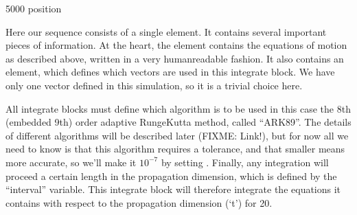 \documentclass[letterpaper,10pt,english]{sphinxmanual}
\begin{document}
\begin{sphinxVerbatim}[commandchars=\\\{\}]
     
    5000
      position
      \PYG{c+cp}{\PYGZlt{}![CDATA[}
        
            
          
      \PYG{c+cp}{]]\PYGZgt{}}
\end{sphinxVerbatim}

\sphinxAtStartPar
Here our sequence consists of a single  element.  It contains several important pieces of information.  At the heart, the  element contains the equations of motion as described above, written in a very human\sphinxhyphen{}readable fashion.  It also contains an  element, which defines which vectors are used in this integrate block.  We have only one vector defined in this simulation, so it is a trivial choice here.

\sphinxAtStartPar
All integrate blocks must define which algorithm is to be used \sphinxhyphen{} in this case the 8th (embedded 9th) order adaptive Runge\sphinxhyphen{}Kutta method, called “ARK89”.  The details of different algorithms will be described later (FIXME: Link!), but for now all we need to know is that this algorithm requires a tolerance, and that smaller means more accurate, so we’ll make it \(10^{-7}\) by setting .  Finally, any integration will proceed a certain length in the propagation dimension, which is defined by the “interval” variable.  This integrate block will therefore integrate the equations it contains with respect to the propagation dimension (‘t’) for 20.
\end{document}
